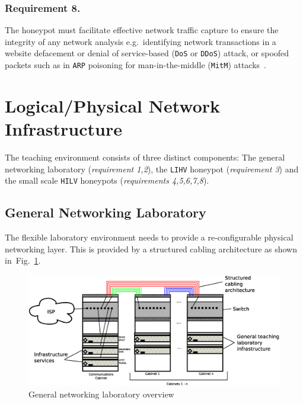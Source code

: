 \documentclass{llncs}
\begin{document}
\subsubsection{Requirement 8.} 
The honeypot must facilitate effective network traffic capture to ensure the
integrity of any network analysis e.g.\ identifying network transactions in a
website defacement or denial of service-based (\texttt{DoS} or \texttt{DDoS})
attack, or spoofed packets such as in \texttt{ARP} poisoning for
man-in-the-middle (\texttt{MitM}) attacks~\cite{PS:16,RSKA:16}.

\section{Logical/Physical Network Infrastructure}\label{LogicalDesign}

The teaching environment consists of three distinct components: The general
networking laboratory (\textit{requirement 1,2}), the \texttt{LIHV} honeypot
(\textit{requirement 3}) and the small scale \texttt{HILV} honeypots
(\textit{requirements 4,5,6,7,8}).

\subsection{General Networking Laboratory}

The flexible laboratory environment needs to provide a re-configurable physical
networking layer. This is provided by a structured cabling architecture as
shown in~Fig.~\ref{fig:Overview1}.

\begin{figure}[h]
\begin{center}
	\includegraphics[scale=0.4]{Images/Infrastructure.eps}
\caption{General networking laboratory overview}
\label{fig:Overview1}
\end{center}
\end{figure}
\end{document}
